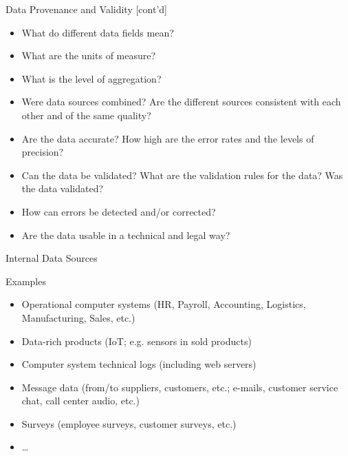 \documentclass[ignorenonframetext,xcolor=x11names]{beamer}
\begin{document}
\begin{frame}{Data Provenance and Validity \small [cont'd]}
\begin{itemize}
	\item What do different data fields mean? 
	\item What are the units of measure? 
	\item What is the level of aggregation?
	\item Were data sources combined? Are the different sources consistent with each other and of the same quality?
	\item Are the data accurate? How high are the error rates and the levels of precision?
	\item Can the data be validated? What are the validation rules for the data? Was the data validated?
	\item How can errors be detected and/or corrected?
	\item Are the data usable in a technical and legal way?
\end{itemize}
\end{frame}

\begin{frame}{Internal Data Sources}
\begin{block}{Examples}
\begin{itemize}
	\item Operational computer systems (HR, Payroll, Accounting, Logistics, Manufacturing, Sales, etc.)
	\item Data-rich products (IoT; e.g. sensors in sold products)
	\item Computer system technical logs (including web servers)
	\item Message data (from/to suppliers, customers, etc.; e-mails, customer service chat, call center audio, etc.)
	\item Surveys (employee surveys, customer surveys, etc.)
	\item \ldots
\end{itemize}
\end{block}
\end{frame}
\end{document}
